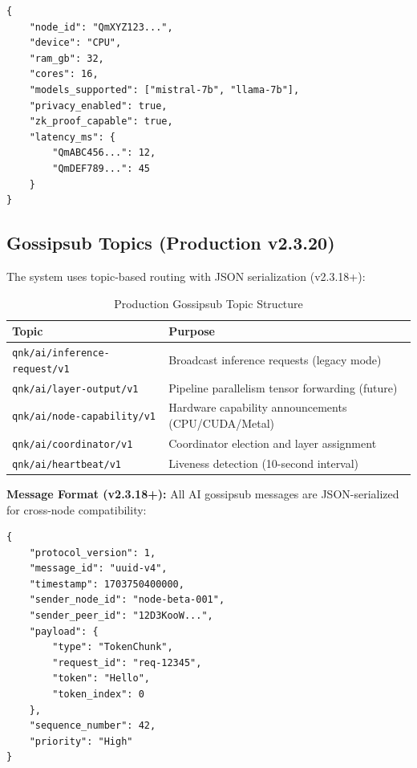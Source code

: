 \documentclass[11pt,a4paper]{article}
\begin{document}
\begin{lstlisting}[caption={Capability Advertisement Message}, label=lst:capability]
{
    "node_id": "QmXYZ123...",
    "device": "CPU",
    "ram_gb": 32,
    "cores": 16,
    "models_supported": ["mistral-7b", "llama-7b"],
    "privacy_enabled": true,
    "zk_proof_capable": true,
    "latency_ms": {
        "QmABC456...": 12,
        "QmDEF789...": 45
    }
}
\end{lstlisting}

\subsection{Gossipsub Topics (Production v2.3.20)}

The system uses topic-based routing with JSON serialization (v2.3.18+):

\begin{table}[H]
\centering
\caption{Production Gossipsub Topic Structure}
\label{tab:topics}
\begin{tabular}{|l|p{8cm}|}
\hline
\textbf{Topic} & \textbf{Purpose} \\
\hline
\texttt{qnk/ai/inference-request/v1} & Broadcast inference requests (legacy mode) \\
\texttt{qnk/ai/layer-output/v1} & Pipeline parallelism tensor forwarding (future) \\
\texttt{qnk/ai/node-capability/v1} & Hardware capability announcements (CPU/CUDA/Metal) \\
\texttt{qnk/ai/coordinator/v1} & Coordinator election and layer assignment \\
\texttt{qnk/ai/heartbeat/v1} & Liveness detection (10-second interval) \\
\hline
\end{tabular}
\end{table}

\textbf{Message Format (v2.3.18+):} All AI gossipsub messages are JSON-serialized for cross-node compatibility:

\begin{lstlisting}[caption={AIGossipsubMessage JSON Format}]
{
    "protocol_version": 1,
    "message_id": "uuid-v4",
    "timestamp": 1703750400000,
    "sender_node_id": "node-beta-001",
    "sender_peer_id": "12D3KooW...",
    "payload": {
        "type": "TokenChunk",
        "request_id": "req-12345",
        "token": "Hello",
        "token_index": 0
    },
    "sequence_number": 42,
    "priority": "High"
}
\end{lstlisting}
\end{document}
